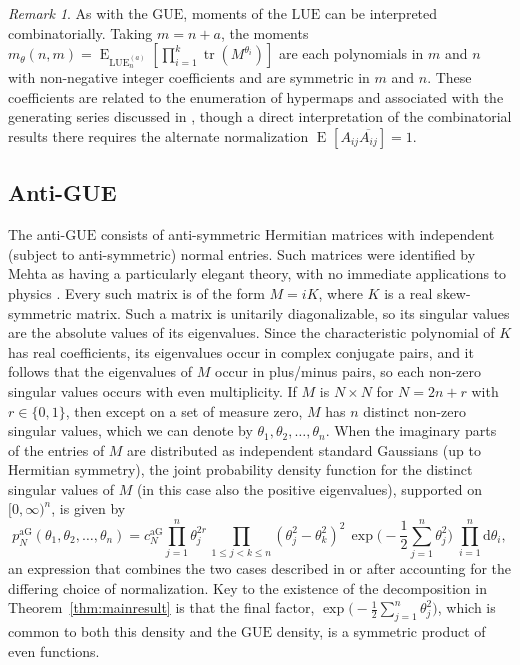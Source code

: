 \documentclass[pdftex, oneside, 10pt, letterpaper]{amsart}
\theoremstyle{plain}
\theoremstyle{definition}
\theoremstyle{remark}
\newtheorem*{rem}{Remark}
\begin{document}
\begin{rem}
  As with the {\ensuremath{\mathrm{GUE}}}{}, moments of the {\ensuremath{\mathrm{LUE}}}{} can be interpreted
  combinatorially.  Taking $m=n+a$, the moments
  $m_\theta(n,m)={\operatorname{E}_{{\ensuremath{\mathrm{LUE}}}_n^{(a)}}\left[{\prod_{i=1}^k\operatorname{tr}(M^{\theta_i})}\right]}$ are
  each polynomials in $m$ and $n$ with non-negative integer
  coefficients and are symmetric in $m$ and $n$.  These coefficients
  are related to the enumeration of hypermaps and associated with the
  generating series discussed in \cite{JV-Eulerian}, though a direct
  interpretation of the combinatorial results there requires the
  alternate normalization ${\operatorname{E}_{}\left[{A_{ij}\overline{A_{ij}}}\right]}=1$.
\end{rem}

\subsection*{Anti-GUE}\label{sec:antiGUE}

The anti-{\ensuremath{\mathrm{GUE}}}{} consists of anti-symmetric Hermitian matrices with
independent (subject to anti-symmetric) normal entries.  Such matrices
were identified by Mehta as having a particularly elegant theory, with
no immediate applications to physics \cite[Ch.~13]{Mehta}.  Every such
matrix is of the form $M=iK$, where $K$ is a real skew-symmetric
matrix.  Such a matrix is unitarily diagonalizable, so its singular
values are the absolute values of its eigenvalues.  Since the
characteristic polynomial of $K$ has real coefficients, its
eigenvalues occur in complex conjugate pairs, and it follows that the
eigenvalues of $M$ occur in plus/minus pairs, so each non-zero
singular values occurs with even multiplicity.  If $M$ is $N\times{}N$
for $N=2n+r$ with $r\in\{0,1\}$, then except on a set of measure zero,
$M$ has $n$ distinct non-zero singular values, which we can denote by
$\theta_1,\theta_2,\dotsc,\theta_n$.  When the imaginary parts of the
entries of $M$ are distributed as independent standard Gaussians (up
to Hermitian symmetry), the joint probability density function for the
distinct singular values of $M$ (in this case also the positive
eigenvalues), supported on $[0,\infty)^n$, is given by
\begin{equation}\label{eqn:skewdensity}
  p^{\mathrm{aG}}_N(\theta_1,\theta_2,\dotsc,\theta_n)=
  c^{\mathrm{aG}}_{N}\prod_{j=1}^n\theta_j^{2r}\,\prod_{1\leq j<k\leq n}
  \left(\theta_j^2-\theta_k^2\right)^2
  \,\exp\big(-\frac{1}{2}\sum_{j=1}^n\theta_j^2\big)
    {\;\prod_{i={1}}^{{n}} \mathrm{d}{{\theta}}_i},
\end{equation}
an expression that combines the two cases described in
\cite[Section~3.4]{Mehta} or \cite[Ex~1.3~q.5]{Forrester-Log-gases}
after accounting for the differing choice of normalization.  Key to
the existence of the decomposition in Theorem~\ref{thm:mainresult} is
that the final factor,
$\exp\big(-\frac{1}{2}\sum_{j=1}^n\theta_j^2\big)$, which is common to
both this density and the {\ensuremath{\mathrm{GUE}}}{} density, is a symmetric product of
even functions.
\end{document}

